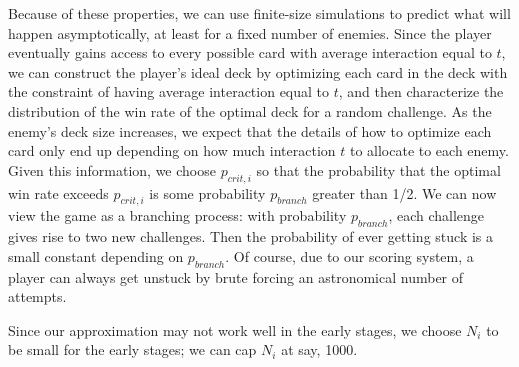 \documentclass[11pt]{article}
\begin{document}
Because of these properties, we can use finite-size simulations to predict what will happen asymptotically, at least for a fixed number of enemies.
Since the player eventually gains access to every possible card with average interaction equal to $t$, we can construct the player's ideal deck by optimizing each card in the deck with the constraint of having average interaction equal to $t$, and then characterize the distribution of the win rate of the optimal deck for a random challenge.
As the enemy's deck size increases, we expect that the details of how to optimize each card only end up depending on how much interaction $t$ to allocate to each enemy.
Given this information, we choose $p_{crit,i}$ so that the probability that the optimal win rate exceeds $p_{crit,i}$ is some probability $p_{branch}$ greater than 1/2.  We can now view the game as a branching process: with probability $p_{branch}$, each challenge gives rise to two new challenges.  Then the probability of ever getting stuck is a small constant depending on $p_{branch}$.  Of course, due to our scoring system, a player can always get unstuck by brute forcing an astronomical number of attempts.

Since our approximation may not work well in the early stages, we choose $N_i$ to be small for the early stages; we can cap $N_i$ at say, 1000.
\end{document}
